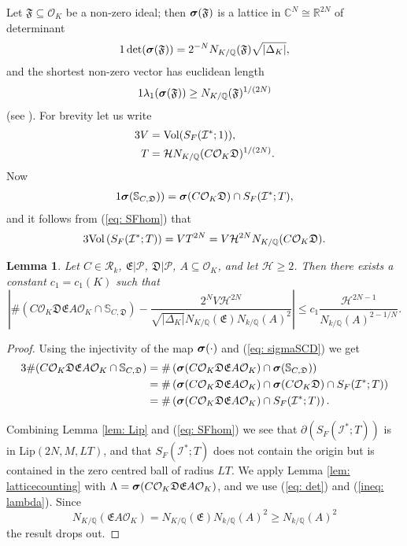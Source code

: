 \documentclass[11pt]{amsart}
\newtheorem{lemma}{Lemma}[section]
\numberwithin{equation}{eqncounter}
\def\IR{\mathbb R}
\def\IC{\mathbb C}
\def\IQ{\mathbb Q}
\def\IS{\mathbb S}
\def\Pc{\mathcal{P}}
\def\H{\mathcal{H}}
\def\I{\mathcal{I}}
\def\R{\mathcal{R}}
\def\D{\mathfrak{D}}
\def\E{\mathfrak{E}}
\def\F{\mathfrak{F}}
\renewcommand{\vec}[1]{\mbox{\boldmath$#1$}}
\def\Vol{\textup{Vol}}
\def\Oseen{{\mathcal{O}}}
\def\bsigma{{\vec{\sigma}}}
\begin{document}
Let $\F\subseteq \Oseen_K$ be a non-zero ideal; then $\bsigma(\F)$ is a lattice in $\IC^N\cong \IR^{2N}$ of determinant 
\begin{alignat}1\label{eq: det}
\det(\bsigma(\F))=2^{-N}N_{K/\IQ}(\F)\sqrt{|\Delta_K|},
\end{alignat}
and the shortest non-zero vector has euclidean length 
\begin{alignat}1\label{ineq: lambda}
\lambda_1(\bsigma(\F))\geq N_{K/\IQ}(\F)^{1/(2N)}
\end{alignat}
(see \cite[Lemma 5]{MasserVaaler2}).
For brevity let us write 
\begin{alignat*}3
V&=\Vol(S_F(\I^*;1)),\\
T&=\H N_{K/\IQ}(C\Oseen_K\D)^{1/(2N)}.
\end{alignat*}
Now 
\begin{alignat}1\label{eq: sigmaSCD}
\bsigma(\IS_{C,\D}))=\bsigma(C\Oseen_K\D)\cap S_F(\I^*;T),
\end{alignat}
and it follows from (\ref{eq: SFhom}) that 
\begin{alignat*}3
\Vol\left(S_F(\I^*;T)\right)=VT^{2N}=V\H^{2N}N_{K/\IQ}(C\Oseen_K\D).
\end{alignat*}






\begin{lemma}\label{lem: idealcount}
Let $C\in \R_k$, $\E|\Pc$, $\D|\Pc$,  $A \subseteq \Oseen_K$, and let $\H\geq 2$.
Then there exists a constant $c_1=c_1(K)$ such that
$$\left|\#(C\Oseen_K\D\E A\Oseen_K\cap \IS_{C,\D})-\frac{2^N V\H^{2N}}{\sqrt{|\Delta_K|}N_{K/\IQ}(\E)N_{k/\IQ}(A)^2}\right|\leq c_1\frac{\H^{2N-1}}{N_{k/\IQ}(A)^{2-1/N}}.$$
\end{lemma}
\begin{proof}
Using the injectivity of the map $\bsigma(\cdot)$ and (\ref{eq: sigmaSCD}) 
we get
\begin{alignat*}3
\#(C\Oseen_K\D\E A\Oseen_K\cap \IS_{C,\D})&=\#\left(\bsigma(C\Oseen_K\D\E A\Oseen_K)\cap \bsigma(\IS_{C,\D})\right)\\
&=\#\left(\bsigma(C\Oseen_K\D\E A\Oseen_K)\cap\bsigma(C\Oseen_K\D)\cap S_F(\I^*;T)\right)\\
&=\#\left(\bsigma(C\Oseen_K\D\E A\Oseen_K)\cap S_F(\I^*;T)\right).
\end{alignat*}

Combining  Lemma \ref{lem: Lip} and (\ref{eq: SFhom}) we see that $\partial(S_F(\I^*;T))$
is in Lip$(2N,M,L T)$, and that $S_F(\I^*;T)$ does not contain the origin but is contained in the zero centred ball of radius $LT$.
We apply Lemma \ref{lem: latticecounting} with $\Lambda=\bsigma(C\Oseen_K\D\E A\Oseen_K)$, and we use (\ref{eq: det}) and (\ref{ineq: lambda}). Since $$N_{K/\IQ}(\E A\Oseen_K)=N_{K/\IQ}(\E)N_{k/\IQ}(A)^2\geq N_{k/\IQ}(A)^2$$
 the result drops out.
\end{proof}
\end{document}
